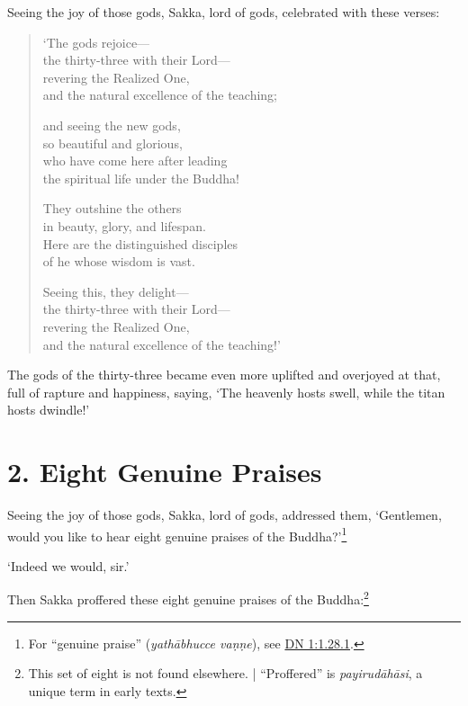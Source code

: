 \documentclass[12pt,openany]{book}%
\begin{document}
Seeing the joy of those gods, Sakka, lord of gods, celebrated with these verses: 

\begin{verse}%
‘The gods rejoice—\\
the thirty-three with their Lord—\\
revering the Realized One, \\
and the natural excellence of the teaching; 

and seeing the new gods, \\
so beautiful and glorious, \\
who have come here after leading \\
the spiritual life under the Buddha! 

They outshine the others \\
in beauty, glory, and lifespan. \\
Here are the distinguished disciples \\
of he whose wisdom is vast. 

Seeing this, they delight—\\
the thirty-three with their Lord—\\
revering the Realized One, \\
and the natural excellence of the teaching!’ 

%
\end{verse}

The gods of the thirty-three became even more uplifted and overjoyed at that, full of rapture and happiness, saying, ‘The heavenly hosts swell, while the titan hosts dwindle!’ 

\section*{2. Eight Genuine Praises }

Seeing the joy of those gods, Sakka, lord of gods, addressed them, ‘Gentlemen, would you like to hear eight genuine praises of the Buddha?’\footnote{For “genuine praise” (\textit{\textsanskrit{yathābhucce} \textsanskrit{vaṇṇe}}), see \href{https://suttacentral.net/dn1/en/sujato\#1.28.1}{DN 1:1.28.1}. } 

‘Indeed we would, sir.’ 

Then Sakka proffered these eight genuine praises of the Buddha:\footnote{This set of eight is not found elsewhere. | “Proffered” is \textit{\textsanskrit{payirudāhāsi}}, a unique term in early texts. } 
\end{document}

